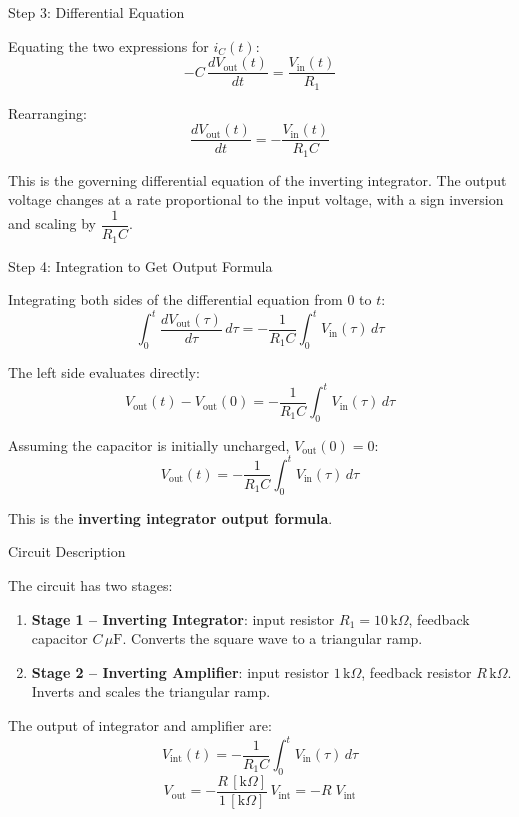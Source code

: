 \documentclass{beamer}
\numberwithin{equation}{section}
\theoremstyle{remark}
\begin{document}
\begin{frame}{Step 3: Differential Equation}
 
Equating the two expressions for $i_C(t)$:
\[
  -C\,\frac{dV_{\mathrm{out}}(t)}{dt} = \frac{V_{\mathrm{in}}(t)}{R_1}
\]
 
Rearranging:
\[
  \frac{dV_{\mathrm{out}}(t)}{dt} = -\frac{V_{\mathrm{in}}(t)}{R_1 C}
\]
 
This is the governing differential equation of the inverting integrator.
The output voltage changes at a rate proportional to the input voltage,
with a sign inversion and scaling by $\dfrac{1}{R_1 C}$.
 
\end{frame}
 
\begin{frame}{Step 4: Integration to Get Output Formula}
 
Integrating both sides of the differential equation from $0$ to $t$:
\[
  \int_0^t \frac{dV_{\mathrm{out}}(\tau)}{d\tau}\,d\tau
  = -\frac{1}{R_1 C}\int_0^t V_{\mathrm{in}}(\tau)\,d\tau
\]
 
The left side evaluates directly:
\[
  V_{\mathrm{out}}(t) - V_{\mathrm{out}}(0)
  = -\frac{1}{R_1 C}\int_0^t V_{\mathrm{in}}(\tau)\,d\tau
\]
 
Assuming the capacitor is initially uncharged, $V_{\mathrm{out}}(0) = 0$:
\[
  \boxed{V_{\mathrm{out}}(t) = -\frac{1}{R_1 C}\int_0^t V_{\mathrm{in}}(\tau)\,d\tau}
\]
 
This is the \textbf{inverting integrator output formula}.
 
\end{frame}


\begin{frame}{Circuit Description}

The circuit has two stages:

\begin{enumerate}
  \item \textbf{Stage 1 -- Inverting Integrator}: input resistor
        $R_1 = 10\,\mathrm{k}\Omega$, feedback capacitor $C\,\mu\mathrm{F}$.
        Converts the square wave to a triangular ramp.
  \item \textbf{Stage 2 -- Inverting Amplifier}: input resistor
        $1\,\mathrm{k}\Omega$, feedback resistor $R\,\mathrm{k}\Omega$.
        Inverts and scales the triangular ramp.
\end{enumerate}

The output of integrator and amplifier are:
\[
  V_{\mathrm{int}}(t) = -\frac{1}{R_1 C}\int_0^t V_{\mathrm{in}}(\tau)\,d\tau
\]
\[
  V_{\mathrm{out}} = -\frac{R\,[\mathrm{k}\Omega]}{1\,[\mathrm{k}\Omega]}\,V_{\mathrm{int}}
  = -R\;V_{\mathrm{int}}
\]

\end{frame}
\end{document}
